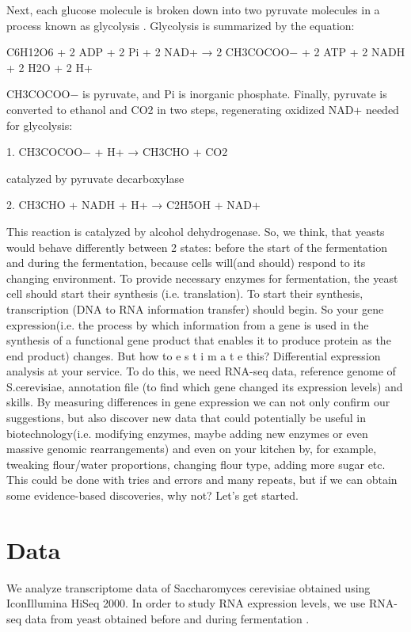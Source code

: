\documentclass{article}
\begin{document}
 
 Next, each glucose molecule is broken down into two pyruvate molecules in a process known as glycolysis \cite{2}. Glycolysis is summarized by the equation:
 
 C6H12O6 + 2 ADP + 2 Pi + 2 NAD+ → 2 CH3COCOO− + 2 ATP + 2 NADH \\
 + 2 H2O + 2 H+
 
 CH3COCOO− is pyruvate, and Pi is inorganic phosphate. Finally, pyruvate is converted to ethanol and CO2 in two steps, regenerating oxidized NAD+ needed for glycolysis:
 
 1. CH3COCOO− + H+ → CH3CHO + CO2
 
 catalyzed by pyruvate decarboxylase
 
 2. CH3CHO + NADH + H+ → C2H5OH + NAD+
 
 This reaction is catalyzed by alcohol dehydrogenase.
 So, we think, that yeasts would behave differently between 2 states: before the start of the fermentation and during the fermentation, because cells will(and should) respond to its changing environment. To provide necessary enzymes for fermentation, the yeast cell should start their synthesis (i.e. translation). To start their synthesis, transcription (DNA to RNA information transfer) should begin. So your gene expression(i.e. the process by which information from a gene is used in the synthesis of a functional gene product that enables it to produce protein as the end product\cite{3}) changes. But how to e s t i m a t e this? Differential expression analysis at your service. To do this, we need RNA-seq data, reference genome of S.cerevisiae, annotation file (to find which gene changed its expression levels) and skills. By measuring differences in gene expression we can not only confirm our suggestions, but also discover new data that could potentially be useful in biotechnology(i.e. modifying enzymes, maybe adding new enzymes or even massive genomic rearrangements) and even on your kitchen by, for example, tweaking flour/water proportions, changing flour type, adding more sugar etc. This could be done with tries and errors and many repeats, but if we can obtain some evidence-based discoveries, why not?
 Let's get started.
 
 
 \section{Data}
We analyze transcriptome data of Saccharomyces cerevisiae
obtained using IconIllumina HiSeq 2000.   In order to study RNA expression levels, we use RNA-seq data from yeast obtained before and during fermentation \cite{data}. 
\end{document}
